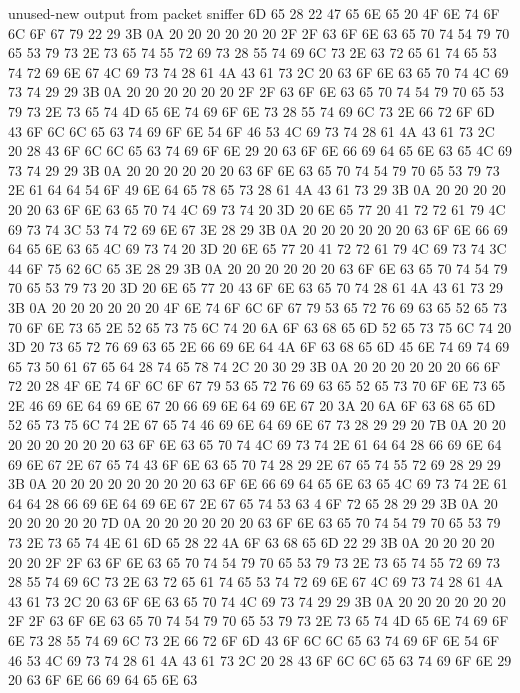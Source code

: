 \begin{chunk}{unused-new output from packet sniffer}
6D 65 28 22 47 65 6E 65 20 4F 6E 74 6F 6C 6F 67 79 22 29 3B 0A 20 20 20 20 
20 20 2F 2F 63 6F 6E 63 65 70 74 54 79 70 65 53 79 73 2E 73 65 74 55 72 69 
73 28 55 74 69 6C 73 2E 63 72 65 61 74 65 53 74 72 69 6E 67 4C 69 73 74 28 
61 4A 43 61 73 2C 20 63 6F 6E 63 65 70 74 4C 69 73 74 29 29 3B 0A 20 20 20 
20 20 20 2F 2F 63 6F 6E 63 65 70 74 54 79 70 65 53 79 73 2E 73 65 74 4D 65 
6E 74 69 6F 6E 73 28 55 74 69 6C 73 2E 66 72 6F 6D 43 6F 6C 6C 65 63 74 69 
6F 6E 54 6F 46 53 4C 69 73 74 28 61 4A 43 61 73 2C 20 28 43 6F 6C 6C 65 63 
74 69 6F 6E 29 20 63 6F 6E 66 69 64 65 6E 63 65 4C 69 73 74 29 29 3B 0A 20 
20 20 20 20 20 63 6F 6E 63 65 70 74 54 79 70 65 53 79 73 2E 61 64 64 54 6F 
49 6E 64 65 78 65 73 28 61 4A 43 61 73 29 3B 0A 20 20 20 20 20 20 63 6F 6E 
63 65 70 74 4C 69 73 74 20 3D 20 6E 65 77 20 41 72 72 61 79 4C 69 73 74 3C 
53 74 72 69 6E 67 3E 28 29 3B 0A 20 20 20 20 20 20 63 6F 6E 66 69 64 65 6E 
63 65 4C 69 73 74 20 3D 20 6E 65 77 20 41 72 72 61 79 4C 69 73 74 3C 44 6F 
75 62 6C 65 3E 28 29 3B 0A 20 20 20 20 20 20 63 6F 6E 63 65 70 74 54 79 70 
65 53 79 73 20 3D 20 6E 65 77 20 43 6F 6E 63 65 70 74 28 61 4A 43 61 73 29 
3B 0A 20 20 20 20 20 20 4F 6E 74 6F 6C 6F 67 79 53 65 72 76 69 63 65 52 65 
73 70 6F 6E 73 65 2E 52 65 73 75 6C 74 20 6A 6F 63 68 65 6D 52 65 73 75 6C 
74 20 3D 20 73 65 72 76 69 63 65 2E 66 69 6E 64 4A 6F 63 68 65 6D 45 6E 74 
69 74 69 65 73 50 61 67 65 64 28 74 65 78 74 2C 20 30 29 3B 0A 20 20 20 20 
20 20 66 6F 72 20 28 4F 6E 74 6F 6C 6F 67 79 53 65 72 76 69 63 65 52 65 73 
70 6F 6E 73 65 2E 46 69 6E 64 69 6E 67 20 66 69 6E 64 69 6E 67 20 3A 20 6A 
6F 63 68 65 6D 52 65 73 75 6C 74 2E 67 65 74 46 69 6E 64 69 6E 67 73 28 29 
29 20 7B 0A 20 20 20 20 20 20 20 20 63 6F 6E 63 65 70 74 4C 69 73 74 2E 61 
64 64 28 66 69 6E 64 69 6E 67 2E 67 65 74 43 6F 6E 63 65 70 74 28 29 2E 67 
65 74 55 72 69 28 29 29 3B 0A 20 20 20 20 20 20 20 20 63 6F 6E 66 69 64 65 
6E 63 65 4C 69 73 74 2E 61 64 64 28 66 69 6E 64 69 6E 67 2E 67 65 74 53 63 
4
6F 72 65 28 29 29 3B 0A 20 20 20 20 20 20 7D 0A 20 20 20 20 20 20 63 6F 6E 
63 65 70 74 54 79 70 65 53 79 73 2E 73 65 74 4E 61 6D 65 28 22 4A 6F 63 68 
65 6D 22 29 3B 0A 20 20 20 20 20 20 2F 2F 63 6F 6E 63 65 70 74 54 79 70 65 
53 79 73 2E 73 65 74 55 72 69 73 28 55 74 69 6C 73 2E 63 72 65 61 74 65 53 
74 72 69 6E 67 4C 69 73 74 28 61 4A 43 61 73 2C 20 63 6F 6E 63 65 70 74 4C 
69 73 74 29 29 3B 0A 20 20 20 20 20 20 2F 2F 63 6F 6E 63 65 70 74 54 79 70 
65 53 79 73 2E 73 65 74 4D 65 6E 74 69 6F 6E 73 28 55 74 69 6C 73 2E 66 72 
6F 6D 43 6F 6C 6C 65 63 74 69 6F 6E 54 6F 46 53 4C 69 73 74 28 61 4A 43 61 
73 2C 20 28 43 6F 6C 6C 65 63 74 69 6F 6E 29 20 63 6F 6E 66 69 64 65 6E 63 

\end{chunk}
